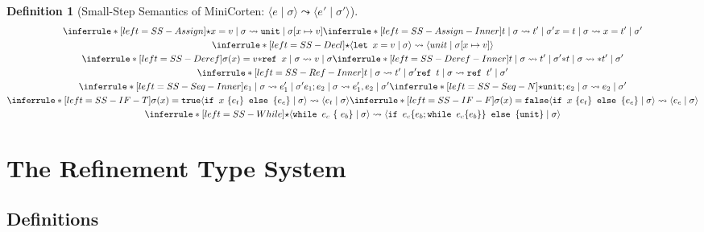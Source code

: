 \documentclass{book}
\newcommand{\code}[1]{\texttt{#1}}
\newcommand{\tuple}[2]{\langle #1 \mid #2 \rangle}
\theoremstyle{definition}
\newtheorem{definition}[theorem]{Definition}
\begin{document}
\begin{definition}[Small-Step Semantics of MiniCorten: $\tuple{e}{\sigma} \leadsto \tuple{e'}{\sigma'}$]


\begin{gather*}
  \inferrule*[left=SS-Assign]
    {\star}
    {x = v \mid \sigma \leadsto \code{unit} \mid \sigma[x \mapsto v]}
  \inferrule*[left=SS-Assign-Inner]
    {t \mid \sigma \leadsto t' \mid \sigma'}
    {x = t \mid \sigma \leadsto x = t' \mid \sigma'}
  \\
  \inferrule*[left=SS-Decl]
    {\star}
    {\tuple{\code{let } x = v}{\sigma} \leadsto \tuple{unit}{\sigma[ x \mapsto v]}}
  \\
  \inferrule*[left=SS-Deref]
    {\sigma(x) = v}
    {* \code{ref } x \mid \sigma \leadsto v \mid \sigma}
  \inferrule*[left=SS-Deref-Inner]
    {t \mid \sigma \leadsto t' \mid \sigma'}
    {* t \mid \sigma \leadsto * t' \mid \sigma'}
  \\
  \inferrule*[left=SS-Ref-Inner]
      {t \mid \sigma \leadsto t' \mid \sigma'}
      {\code{ref } t \mid \sigma \leadsto \code{ref } t' \mid \sigma'}
  \\
  \inferrule*[left=SS-Seq-Inner]
      {e_1 \mid \sigma \leadsto e_1' \mid \sigma'}
      {e_1; e_2 \mid \sigma \leadsto e_1', e_2 \mid \sigma'}
  \inferrule*[left=SS-Seq-N]
    {\star}
    {\code{unit}; e_2 \mid \sigma \leadsto e_2 \mid \sigma'}
  \\
  \inferrule*[left=SS-IF-T]
    {\sigma(x) = \code{true}}
    {\tuple{\code{if } x\ \{ e_t \} \code { else } \{ e_e \} }{\sigma} \leadsto \tuple{e_t}{\sigma}}
  \inferrule*[left=SS-IF-F]
    {\sigma(x) = \code{false}}
    {\tuple{\code{if } x\ \{ e_t \} \code { else } \{ e_e \} }{\sigma} \leadsto \tuple{e_e}{\sigma}}
  \\
  \inferrule*[left=SS-While]
    {\star}
    {
      \tuple{ \code{while } e_c\ \{\ e_b \}}{\sigma}
      \leadsto
      \tuple{ \code{if } e_c \{ e_b;  \code{while } e_c \{ e_b \} \} { \code{ else } } \{ \code{unit} \} }{\sigma}
    }
\end{gather*}

\end{definition}

\chapter{The Refinement Type System}

\section{Definitions}
\end{document}
